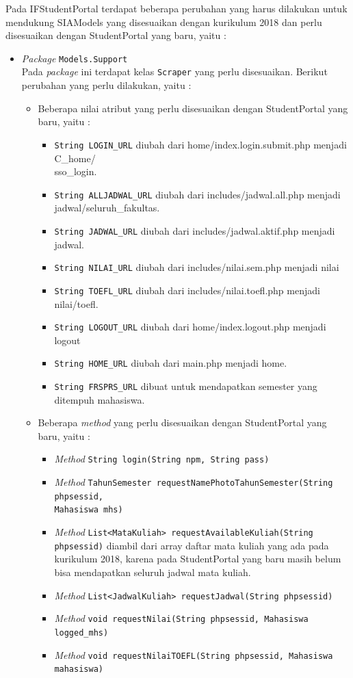 Pada IFStudentPortal terdapat beberapa perubahan yang harus dilakukan untuk mendukung SIAModels yang disesuaikan dengan kurikulum 2018 dan perlu disesuaikan dengan StudentPortal yang baru, yaitu :
\begin{itemize}
	\item \textit{Package} \texttt{Models.Support} \\
	Pada \textit{package} ini terdapat kelas \texttt{Scraper} yang perlu disesuaikan. Berikut perubahan yang perlu dilakukan, yaitu :
	\begin{itemize}
		\item Beberapa nilai atribut yang perlu disesuaikan dengan StudentPortal yang baru, yaitu :
		\begin{itemize}
			\item \texttt{String LOGIN\_URL} diubah dari home/index.login.submit.php menjadi C\_home/\\sso\_login.
			\item \texttt{String ALLJADWAL\_URL} diubah dari includes/jadwal.all.php menjadi jadwal/seluruh\_fakultas.
			\item \texttt{String JADWAL\_URL} diubah dari includes/jadwal.aktif.php menjadi jadwal.
			\item \texttt{String NILAI\_URL} diubah dari includes/nilai.sem.php menjadi nilai
			\item \texttt{String TOEFL\_URL} diubah dari includes/nilai.toefl.php menjadi nilai/toefl.
			\item \texttt{String LOGOUT\_URL} diubah dari home/index.logout.php menjadi logout
			\item \texttt{String HOME\_URL} diubah dari main.php menjadi home.
			\item \texttt{String FRSPRS\_URL} dibuat untuk mendapatkan semester yang ditempuh mahasiswa.
		\end{itemize}
		\item Beberapa \textit{method} yang perlu disesuaikan dengan StudentPortal yang baru, yaitu :
		\begin{itemize}
			\item \textit{Method} \texttt{String login(String npm, String pass)}
			\item \textit{Method} \texttt{TahunSemester requestNamePhotoTahunSemester(String phpsessid, \\Mahasiswa mhs)}
			\item \textit{Method} \texttt{List<MataKuliah> requestAvailableKuliah(String phpsessid)} diambil dari array daftar mata kuliah yang ada pada kurikulum 2018, karena pada StudentPortal yang baru masih belum bisa mendapatkan seluruh jadwal mata kuliah. 
			\item \textit{Method} \texttt{List<JadwalKuliah> requestJadwal(String phpsessid)}
			\item \textit{Method} \texttt{void requestNilai(String phpsessid, Mahasiswa logged\_mhs)}
			\item \textit{Method} \texttt{void requestNilaiTOEFL(String phpsessid, Mahasiswa mahasiswa)}
		\end{itemize}
	\end{itemize}
\end{itemize}

